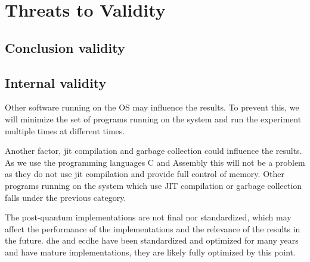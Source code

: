\section{Threats to Validity}



\subsection{Conclusion validity}


\subsection{Internal validity}
\label{section:method:internal-validity}
Other software running on the OS may influence the results. To prevent this, we will minimize the set of programs running on the system and run the experiment multiple times at different times.

Another factor, \gls{jit} compilation and garbage collection could influence the results. As we use the programming languages C and Assembly this will not be a problem as they do not use \gls{jit} compilation and provide full control of memory. Other programs running on the system which use JIT compilation or garbage collection falls under the previous category.




The post-quantum implementations are not final nor standardized, which may affect the performance of the implementations and the relevance of the results in the future. \gls{dhe} and \gls{ecdhe} have been standardized and optimized for many years and have mature implementations, they are likely fully optimized by this point.

